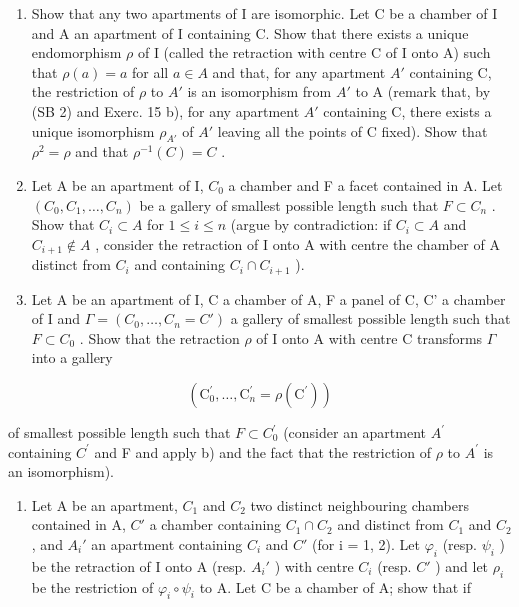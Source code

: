 \begin{enumerate}
\def\labelenumi{\alph{enumi})}
\item
  Show that any two apartments of I are isomorphic. Let C be a chamber of I and A an apartment of I containing C. Show that there exists a unique endomorphism \(\rho\) of I (called the retraction with centre C of I onto A) such that \(\rho(a)=a\) for all \(a\in A\) and that, for any apartment \(A'\) containing C, the restriction of \(\rho\) to \(A'\) is an isomorphism from \(A'\) to A (remark that, by (SB 2) and Exerc. 15 b), for any apartment \(A'\) containing C, there exists a unique isomorphism \(\rho_{A'}\) of \(A'\) leaving all the points of C fixed). Show that \(\rho^{2}=\rho\) and that \(\rho^{-1}(C)=C\) .
\item
  Let A be an apartment of I, \(C_{0}\) a chamber and F a facet contained in A. Let \((C_{0}, C_{1}, \ldots, C_{n})\) be a gallery of smallest possible length such that \(F \subset C_{n}\) . Show that \(C_{i} \subset A\) for \(1 \leqslant i \leqslant n\) (argue by contradiction: if \(C_{i} \subset A\) and \(C_{i+1} \notin A\) , consider the retraction of I onto A with centre the chamber of A distinct from \(C_{i}\) and containing \(C_{i} \cap C_{i+1}\) ).
\item
  Let A be an apartment of I, C a chamber of A, F a panel of C, C' a chamber of I and \(\Gamma = (C_0, \ldots, C_n = C')\) a gallery of smallest possible length such that \(F \subset C_0\) . Show that the retraction \(\rho\) of I onto A with centre C transforms \(\Gamma\) into a gallery
\end{enumerate}

\[
\left(\mathrm{C} _ {0} ^ {\prime}, \dots , \mathrm{C} _ {n} ^ {\prime} = \rho (\mathrm{C} ^ {\prime})\right)
\]

of smallest possible length such that \(F \subset C_{0}^{\prime}\) (consider an apartment \(A^{\prime}\) containing \(C^{\prime}\) and F and apply b) and the fact that the restriction of \(\rho\) to \(A^{\prime}\) is an isomorphism).

\begin{enumerate}
\def\labelenumi{\alph{enumi})}
\setcounter{enumi}{3}
\tightlist
\item
  Let A be an apartment, \(C_{1}\) and \(C_{2}\) two distinct neighbouring chambers contained in A, \(C'\) a chamber containing \(C_{1} \cap C_{2}\) and distinct from \(C_{1}\) and \(C_{2}\) , and \(A_{i}'\) an apartment containing \(C_{i}\) and \(C'\) (for i = 1, 2). Let \(\varphi_{i}\) (resp. \(\psi_{i}\) ) be the retraction of I onto A (resp. \(A_{i}'\) ) with centre \(C_{i}\) (resp. \(C'\) ) and let \(\rho_{i}\) be the restriction of \(\varphi_{i} \circ \psi_{i}\) to A. Let C be a chamber of A; show that if
\end{enumerate}


